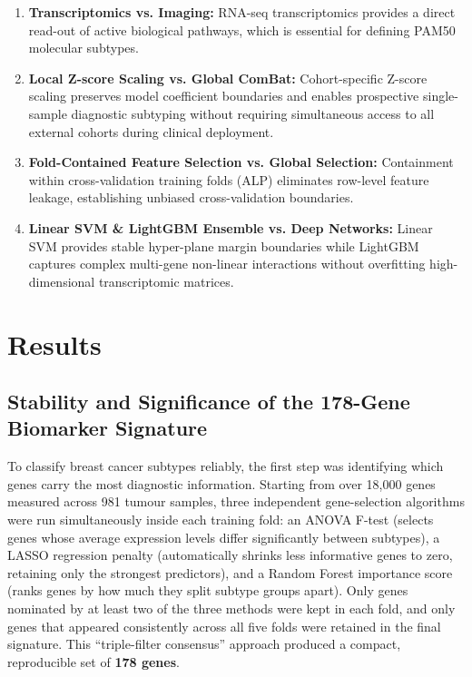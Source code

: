 \documentclass[10pt,a4paper,twocolumn]{article}
\begin{document}
\begin{enumerate}
    \item \textbf{Transcriptomics vs. Imaging:} RNA-seq transcriptomics provides a direct read-out of active biological pathways, which is essential for defining PAM50 molecular subtypes.
    \item \textbf{Local Z-score Scaling vs. Global ComBat:} Cohort-specific Z-score scaling preserves model coefficient boundaries and enables prospective single-sample diagnostic subtyping without requiring simultaneous access to all external cohorts during clinical deployment.
    \item \textbf{Fold-Contained Feature Selection vs. Global Selection:} Containment within cross-validation training folds (ALP) eliminates row-level feature leakage, establishing unbiased cross-validation boundaries.
    \item \textbf{Linear SVM \& LightGBM Ensemble vs. Deep Networks:} Linear SVM provides stable hyper-plane margin boundaries while LightGBM captures complex multi-gene non-linear interactions without overfitting high-dimensional transcriptomic matrices.
\end{enumerate}

\section{Results}
\subsection{Stability and Significance of the 178-Gene Biomarker Signature}

To classify breast cancer subtypes reliably, the first step was identifying which genes carry the most diagnostic information. Starting from over 18,000 genes measured across 981 tumour samples, three independent gene-selection algorithms were run simultaneously inside each training fold: an ANOVA F-test (selects genes whose average expression levels differ significantly between subtypes), a LASSO regression penalty (automatically shrinks less informative genes to zero, retaining only the strongest predictors), and a Random Forest importance score (ranks genes by how much they split subtype groups apart). Only genes nominated by at least two of the three methods were kept in each fold, and only genes that appeared consistently across all five folds were retained in the final signature. This ``triple-filter consensus'' approach produced a compact, reproducible set of \textbf{178 genes}.
\end{document}
